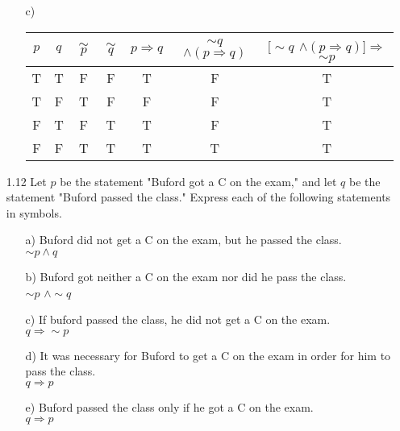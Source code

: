 \documentclass[12pt]{article}
\begin{document}
\begin{enumerate}
\begin{enumerate}
\item[c)]
\begin{tabular}{c|c|c|c|c|c|c}
\hline
$p$ & $q$ & $\sim$$p$ & $\sim$$q$ & $p \Rightarrow q$ & $\sim$$q$ $\wedge (p \Rightarrow q)$ & 
$[\sim$$q$ $\wedge (p \Rightarrow q)] \Rightarrow $$\sim$$p$\\
\hline
T & T & F & F & T & F & T \\
T & F & T & F & F & F & T \\
F & T & F & T & T & F & T \\
F & F & T & T & T & T & T \\
\hline
\end{tabular}
\end{enumerate}

\item[1.12] Let $p$ be the statement "Buford got a C on the exam," and let $q$ be the statement "Buford passed the class." Express each of the following statements in symbols.
\begin{enumerate}
\item[a)] Buford did not get a C on the exam, but he passed the class. \\
$\sim$$p \wedge q$
\item[b)] Buford got neither a C on the exam nor did he pass the class.\\
$\sim$$p$ $\wedge \sim$$q$
\item[c)] If buford passed the class, he did not get a C on the exam.\\
$q \Rightarrow \sim$$p$
\item[d)] It was necessary for Buford to get a C on the exam in order for him to pass the class.\\
$q \Rightarrow p$
\item[e)] Buford passed the class only if he got a C on the exam.\\
$q \Rightarrow p$
\end{enumerate}


\end{enumerate}
\end{document}
